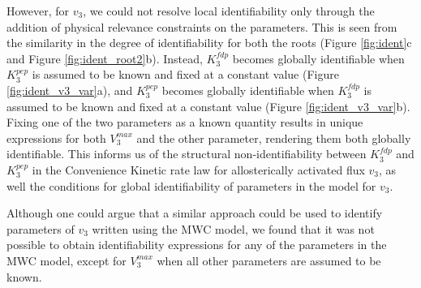 \documentclass[10pt]{article}
\begin{document}
	However, for $v_3$, we could not resolve local identifiability only through the addition of physical relevance constraints on the parameters. This is seen from the similarity in the degree of identifiability for both the roots (Figure \ref{fig:ident}c and Figure \ref{fig:ident_root2}b). Instead, $K_3^{fdp}$ becomes globally identifiable when $K_3^{pep}$ is assumed to be known and fixed at a constant value (Figure \ref{fig:ident_v3_var}a), and $K_3^{pep}$ becomes globally identifiable when $K_3^{fdp}$ is assumed to be known and fixed at a constant value (Figure \ref{fig:ident_v3_var}b). Fixing one of the two parameters as a known quantity results in unique expressions for both $V_3^{max}$ and the other parameter, rendering them both globally identifiable. This informs us of the structural non-identifiability between $K_3^{fdp}$ and $K_3^{pep}$ in the Convenience Kinetic rate law for allosterically activated flux $v_3$, as well the conditions for global identifiability of parameters in the model for $v_3$.
	
	 Although one could argue that a similar approach could be used to identify parameters of $v_3$ written using the MWC model, we found that it was not possible to obtain identifiability expressions for any of the parameters in the MWC model, except for $V_3^{max}$ when all other parameters are assumed to be known.	
	 
	
\end{document}
